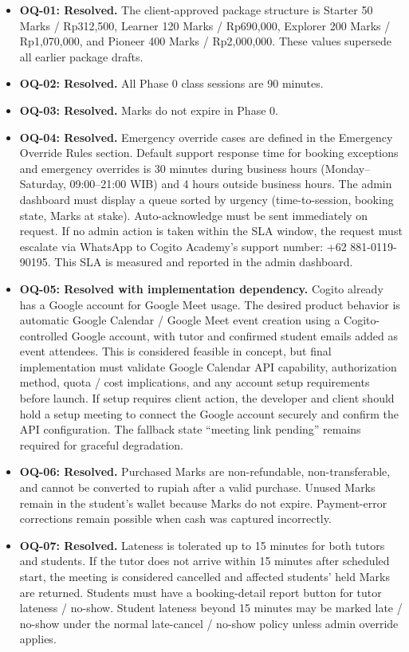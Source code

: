 \documentclass[11pt,a4paper]{article}
\begin{document}
\begin{itemize}
    \item \textbf{OQ-01: Resolved.} The client-approved package structure is Starter 50 Marks / Rp312,500, Learner 120 Marks / Rp690,000, Explorer 200 Marks / Rp1,070,000, and Pioneer 400 Marks / Rp2,000,000. These values supersede all earlier package drafts.
    \item \textbf{OQ-02: Resolved.} All Phase 0 class sessions are 90 minutes.
    \item \textbf{OQ-03: Resolved.} Marks do not expire in Phase 0.
    \item \textbf{OQ-04: Resolved.} Emergency override cases are defined in the Emergency Override Rules section. Default support response time for booking exceptions and emergency overrides is 30 minutes during business hours (Monday--Saturday, 09:00--21:00 WIB) and 4 hours outside business hours. The admin dashboard must display a queue sorted by urgency (time-to-session, booking state, Marks at stake). Auto-acknowledge must be sent immediately on request. If no admin action is taken within the SLA window, the request must escalate via WhatsApp to Cogito Academy's support number: +62 881-0119-90195. This SLA is measured and reported in the admin dashboard.
    \item \textbf{OQ-05: Resolved with implementation dependency.} Cogito already has a Google account for Google Meet usage. The desired product behavior is automatic Google Calendar / Google Meet event creation using a Cogito-controlled Google account, with tutor and confirmed student emails added as event attendees. This is considered feasible in concept, but final implementation must validate Google Calendar API capability, authorization method, quota / cost implications, and any account setup requirements before launch. If setup requires client action, the developer and client should hold a setup meeting to connect the Google account securely and confirm the API configuration. The fallback state ``meeting link pending'' remains required for graceful degradation.
    \item \textbf{OQ-06: Resolved.} Purchased Marks are non-refundable, non-transferable, and cannot be converted to rupiah after a valid purchase. Unused Marks remain in the student's wallet because Marks do not expire. Payment-error corrections remain possible when cash was captured incorrectly.
    \item \textbf{OQ-07: Resolved.} Lateness is tolerated up to 15 minutes for both tutors and students. If the tutor does not arrive within 15 minutes after scheduled start, the meeting is considered cancelled and affected students' held Marks are returned. Students must have a booking-detail report button for tutor lateness / no-show. Student lateness beyond 15 minutes may be marked late / no-show under the normal late-cancel / no-show policy unless admin override applies.

\end{itemize}
\end{document}
